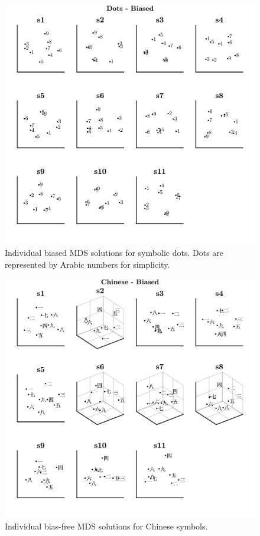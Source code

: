 \begin{figure}[tbh]
\centering \includegraphics[scale = .67]{Figures/Appendix/AppD/Indiv_MDS_2_Biased.jpg}
\caption{Individual biased MDS solutions for symbolic dots. Dots are represented by Arabic numbers for simplicity.}
\label{fig:Apx_MDSdotsBiased}
\end{figure}

\begin{figure}[tbh]
\centering \includegraphics[scale = .67]{Figures/Appendix/AppD/Indiv_MDS_3_Biased.jpg}
\caption{Individual bias-free MDS solutions for Chinese symbols.}
\label{fig:Apx_MDSchineseBiased}
\end{figure}


